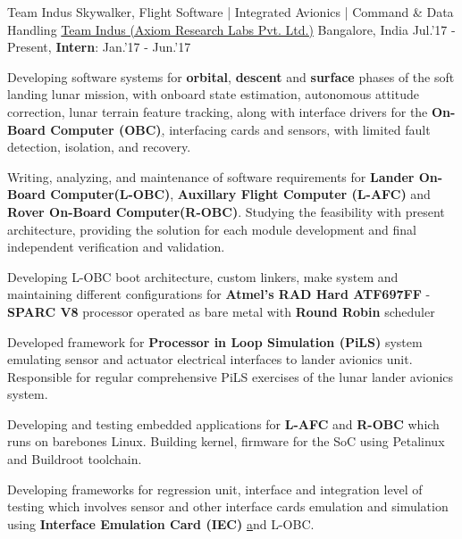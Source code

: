 \begin{cventries}
	\cventry
	{Team Indus Skywalker, Flight Software | Integrated Avionics | Command \& Data Handling}
	{\href{http://www.teamindus.in/}{Team Indus (Axiom Research Labs Pvt. Ltd.)}}
	{Bangalore, India}
	{Jul.'17 - Present, \textbf{Intern}: Jan.'17 - Jun.'17}
	{
		\begin{cvitems}
			\item{Developing software systems for \textbf{orbital}, \textbf{descent} and \textbf{surface} phases of the soft landing lunar mission, with onboard state estimation, autonomous attitude correction, lunar terrain feature tracking, along with interface drivers for the \textbf{On-Board Computer (OBC)}\href{http://ww1.microchip.com/downloads/en/DeviceDoc/ATF697FF.pdf}, interfacing cards and sensors, with limited fault detection, isolation, and recovery.}
			\item{Writing, analyzing, and maintenance of software requirements for \textbf{Lander On-Board Computer(L-OBC)}, \textbf{Auxillary Flight Computer (L-AFC)} and \textbf{Rover On-Board Computer(R-OBC)}. Studying the feasibility with present architecture, providing the solution for each module development and final independent verification and validation.}
			\item{Developing L-OBC boot architecture, custom linkers, make system and maintaining different configurations for \textbf{Atmel's RAD Hard ATF697FF} - \textbf{SPARC V8} processor operated as bare metal with \textbf{Round Robin} scheduler}
			\item{Developed framework for \textbf{Processor in Loop Simulation (PiLS)} system emulating sensor and actuator electrical interfaces to lander avionics unit. Responsible for regular comprehensive PiLS exercises of the lunar lander avionics system.}
			\item{Developing and testing embedded applications for \textbf{L-AFC} and \textbf{R-OBC} which runs on barebones Linux. Building kernel, firmware for the SoC using Petalinux and Buildroot toolchain.}
			\item{Developing frameworks for regression unit, interface and integration level of testing which involves sensor and other interface cards emulation and simulation using \textbf{Interface Emulation Card (IEC) }\href{http://zedboard.org/product/microzed/} and L-OBC.}
		\end{cvitems}
	}
\end{cventries}
